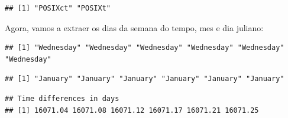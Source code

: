 \documentclass[]{book}
\newenvironment{Shaded}{\begin{snugshade}}{\end{snugshade}}
\newcommand{\KeywordTok}[1]{\textcolor[rgb]{0.13,0.29,0.53}{\textbf{#1}}}
\newcommand{\StringTok}[1]{\textcolor[rgb]{0.31,0.60,0.02}{#1}}
\newcommand{\OperatorTok}[1]{\textcolor[rgb]{0.81,0.36,0.00}{\textbf{#1}}}
\newcommand{\NormalTok}[1]{#1}
\begin{document}
\begin{Shaded}
\end{Shaded}

\begin{verbatim}
## [1] "POSIXct" "POSIXt"
\end{verbatim}

Agora, vamos a extraer os dias da semana do tempo, mes e dia juliano:

\begin{Shaded}
\end{Shaded}

\begin{verbatim}
## [1] "Wednesday" "Wednesday" "Wednesday" "Wednesday" "Wednesday" "Wednesday"
\end{verbatim}

\begin{Shaded}
\end{Shaded}

\begin{verbatim}
## [1] "January" "January" "January" "January" "January" "January"
\end{verbatim}

\begin{Shaded}
\end{Shaded}

\begin{verbatim}
## Time differences in days
## [1] 16071.04 16071.08 16071.12 16071.17 16071.21 16071.25
\end{verbatim}
\end{document}

